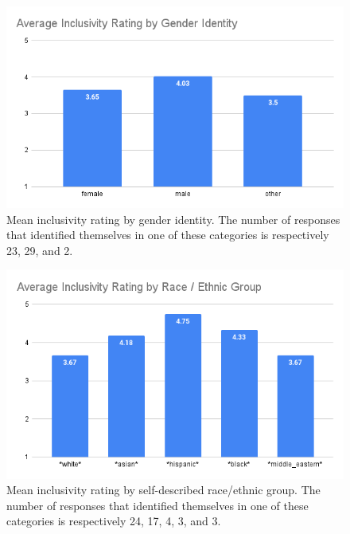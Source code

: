 \documentclass{article}
\begin{document}
\begin{figure}[!h]
\label{gender}
\includegraphics[width=\textwidth]{gender_identity.png}
\caption{Mean inclusivity rating by gender identity.
The number of responses that identified themselves in 
one of these categories is respectively 23, 29, and 2.}
\end{figure}
\begin{figure}[!h]
\label{race}
\includegraphics[width=\textwidth]{race_ethnic_group.png}
\caption{Mean inclusivity rating by self-described race/ethnic group.
The number of responses that identified themselves in 
one of these categories is respectively 24, 17, 4, 3, and 3.}
\end{figure}
\end{document}
